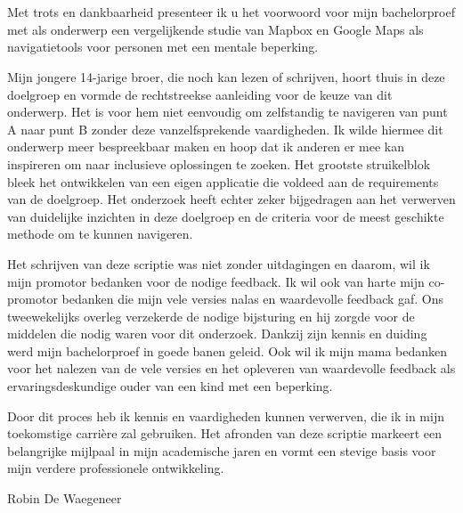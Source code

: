 
\chapter*{}%
\label{ch:voorwoord}



Met trots en dankbaarheid presenteer ik u het voorwoord voor mijn bachelorproef met als onderwerp een vergelijkende studie van Mapbox en Google Maps als navigatietools voor personen met een mentale beperking. 

Mijn jongere 14-jarige broer, die noch kan lezen of schrijven, hoort thuis in deze doelgroep en vormde de rechtstreekse aanleiding voor de keuze van dit onderwerp. Het is voor hem niet eenvoudig om zelfstandig te navigeren van punt A naar punt B zonder deze vanzelfsprekende vaardigheden. Ik wilde hiermee dit onderwerp meer bespreekbaar maken en hoop dat ik anderen er mee kan inspireren om naar inclusieve oplossingen te zoeken. Het grootste struikelblok bleek het ontwikkelen van een eigen applicatie die voldeed aan de requirements van de doelgroep. Het onderzoek heeft echter zeker bijgedragen aan het verwerven van duidelijke inzichten in deze doelgroep en de criteria voor de meest geschikte methode om te kunnen navigeren. 

Het schrijven van deze scriptie was niet zonder uitdagingen en daarom, wil ik mijn promotor bedanken voor de nodige feedback. Ik wil ook van harte mijn co-promotor bedanken die mijn vele versies nalas en waardevolle feedback gaf. Ons tweewekelijks overleg verzekerde de nodige bijsturing en hij zorgde voor de middelen die nodig waren voor dit onderzoek. Dankzij zijn kennis en duiding werd mijn bachelorproef in goede banen geleid. Ook wil ik mijn mama bedanken voor het nalezen van de vele versies en het opleveren van waardevolle feedback als ervaringsdeskundige ouder van een kind met een beperking.

Door dit proces heb ik kennis en vaardigheden kunnen verwerven, die ik in mijn toekomstige carrière zal gebruiken. Het afronden van deze scriptie markeert een belangrijke mijlpaal in mijn academische jaren en vormt een stevige basis voor mijn verdere professionele ontwikkeling.

Robin De Waegeneer
